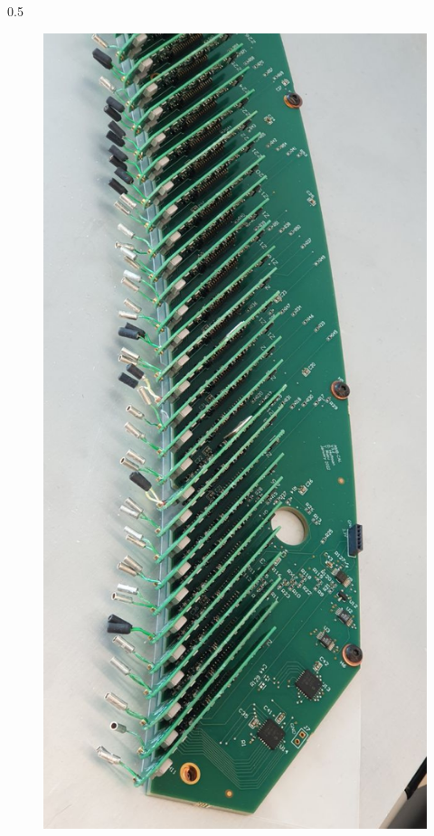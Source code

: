 \documentclass{beamer}
\begin{document}
\begin{frame}
\begin{columns}
\begin{column}{0.5\framewidth}
\begin{figure}[!h]
\includegraphics[angle=90,width=1.1\columnwidth]{figures/jpg/photo_6028424923279639562_y.jpg}
     \label{fig:normalhits}
\end{figure}

\end{column}
\end{columns}
\end{frame}
\end{document}
